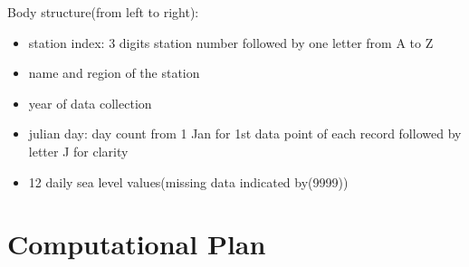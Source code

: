 \documentclass[fontsize=11pt]{article}
\begin{document}
    Body structure(from left to right):
    \begin{itemize}
        \item
        station index: 3 digits station number followed by one letter from A to Z
        \item
        name and region of the station
        \item
        year of data collection
        \item
        julian day: day count from 1 Jan for 1st data point of each record followed by letter J for clarity
        \item
        12 daily sea level values(missing data indicated by(9999))
    \end{itemize}


    \section*{Computational Plan}
\end{document}
